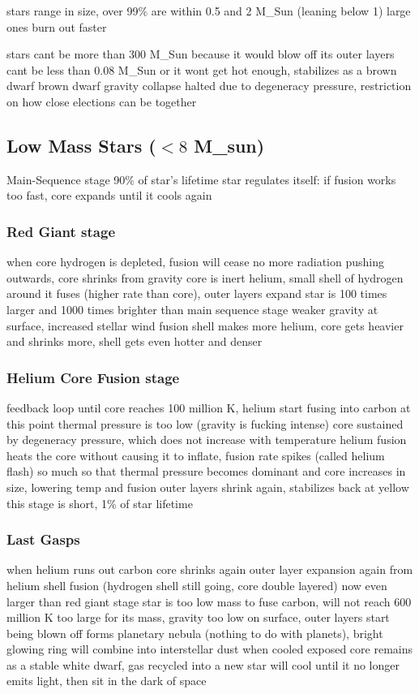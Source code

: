 stars range in size, over 99\% are within 0.5 and 2 M\_Sun (leaning below 1)
large ones burn out faster

stars cant be more than 300 M\_Sun because it would blow off its outer layers
cant be less than 0.08 M\_Sun or it wont get hot enough, stabilizes as a brown dwarf
brown dwarf gravity collapse halted due to degeneracy pressure, restriction on how close elections can be together

\subsection{Low Mass Stars ($<8$ M\_sun)}
    Main-Sequence stage
        90\% of star's lifetime
        star regulates itself: if fusion works too fast, core expands until it cools again

    \subsubsection{Red Giant stage}
        when core hydrogen is depleted, fusion will cease
        no more radiation pushing outwards, core shrinks from gravity
        core is inert helium, small shell of hydrogen around it fuses (higher rate than core), outer layers expand
        star is 100 times larger and 1000 times brighter than main sequence stage
        weaker gravity at surface, increased stellar wind
        fusion shell makes more helium, core gets heavier and shrinks more, shell gets even hotter and denser

    \subsubsection{Helium Core Fusion stage}
        feedback loop until core reaches 100 million K, helium start fusing into carbon
        at this point thermal pressure is too low (gravity is fucking intense)
        core sustained by degeneracy pressure, which does not increase with temperature
        helium fusion heats the core without causing it to inflate, fusion rate spikes (called helium flash)
        so much so that thermal pressure becomes dominant and core increases in size, lowering temp and fusion
        outer layers shrink again, stabilizes back at yellow
        this stage is short, 1\% of star lifetime

    \subsubsection{Last Gasps}
        when helium runs out carbon core shrinks again
        outer layer expansion again from helium shell fusion (hydrogen shell still going, core double layered)
        now even larger than red giant stage
        star is too low mass to fuse carbon, will not reach 600 million K
        too large  for its mass, gravity too low on surface, outer layers start being blown off
        forms planetary nebula (nothing to do with planets), bright glowing ring
        will combine into interstellar dust when cooled
        exposed core remains as a stable white dwarf, gas recycled into a new star
        will cool until it no longer emits light, then sit in the dark of space


